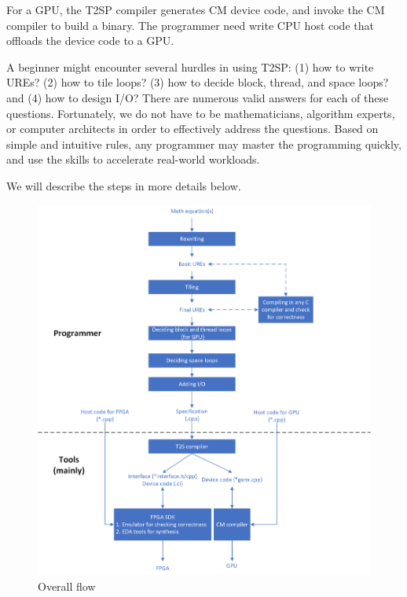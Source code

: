 For a GPU, the T2SP compiler generates CM device code, and invoke the CM compiler to build a binary. The programmer need write CPU host code that offloads the device code to a GPU. 

A beginner might encounter several hurdles in using T2SP: (1) how to write UREs? (2) how to tile loops? (3) how to decide block, thread, and space loops? and (4) how to design I/O? There are numerous valid answers for each of these questions. Fortunately, we do not have to be mathematicians, algorithm experts, or computer architects in order to effectively address the questions. Based on simple and intuitive rules, any programmer may master the programming quickly, and  use the skills to accelerate real-world workloads.

We will describe the steps in more details below. 

\begin{figure}[!ht]
    \centering
    \includegraphics[width=\textwidth]{img/overall-flow.png}
    \caption{Overall flow}
    \label{fig:overall-flow}
\end{figure}
